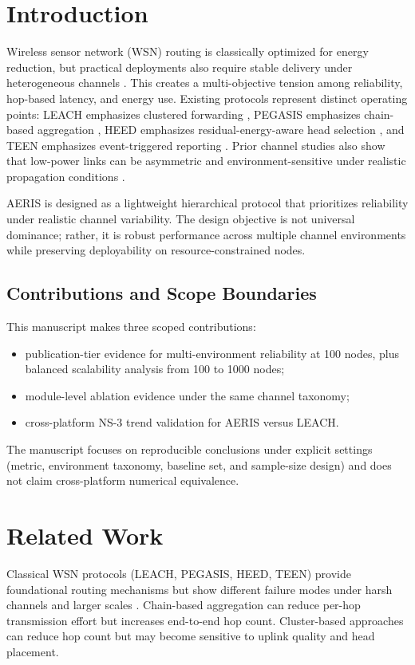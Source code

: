 \documentclass[sensors,article,submit,moreauthors,pdftex]{Definitions/mdpi}
\begin{document}
\section{Introduction}
Wireless sensor network (WSN) routing is classically optimized for energy reduction, but practical deployments also require stable delivery under heterogeneous channels \cite{Akyildiz2002Survey,Rault2016Energy,Kandris2020}. This creates a multi-objective tension among reliability, hop-based latency, and energy use. Existing protocols represent distinct operating points: LEACH emphasizes clustered forwarding \cite{Heinzelman2000LEACH}, PEGASIS emphasizes chain-based aggregation \cite{Lindsey2002PEGASIS}, HEED emphasizes residual-energy-aware head selection \cite{Younis2004HEED}, and TEEN emphasizes event-triggered reporting \cite{Manjeshwar2001TEEN}. Prior channel studies also show that low-power links can be asymmetric and environment-sensitive under realistic propagation conditions \cite{Zuniga2004,Zuniga2007Asymmetry,Baccour2012RLQE}.

AERIS is designed as a lightweight hierarchical protocol that prioritizes reliability under realistic channel variability. The design objective is not universal dominance; rather, it is robust performance across multiple channel environments while preserving deployability on resource-constrained nodes.

\subsection*{Contributions and Scope Boundaries}
This manuscript makes three scoped contributions:
\begin{itemize}
\item publication-tier evidence for multi-environment reliability at 100 nodes, plus balanced scalability analysis from 100 to 1000 nodes;
\item module-level ablation evidence under the same channel taxonomy;
\item cross-platform NS-3 trend validation for AERIS versus LEACH.
\end{itemize}
The manuscript focuses on reproducible conclusions under explicit settings (metric, environment taxonomy, baseline set, and sample-size design) and does not claim cross-platform numerical equivalence.

\section{Related Work}
Classical WSN protocols (LEACH, PEGASIS, HEED, TEEN) provide foundational routing mechanisms but show different failure modes under harsh channels and larger scales \cite{Heinzelman2002LEACH,Lindsey2002PEGASIS,Younis2004HEED,Kandris2020}. Chain-based aggregation can reduce per-hop transmission effort but increases end-to-end hop count. Cluster-based approaches can reduce hop count but may become sensitive to uplink quality and head placement.
\end{document}
